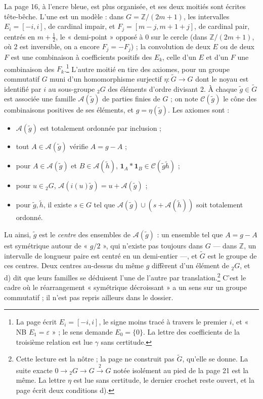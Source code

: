 \documentclass[11pt,a4paper]{article}
\begin{document}
La page 16, à l'encre bleue, est plus organisée, et ses deux moitiés sont
écrites tête-bêche. L'une est un modèle : dans $G = \mathbb{Z}/(2m+1)$, les
intervalles $E_i = [-i, i]$, de cardinal impair, et
$F_j = [m - j, m + 1 + j]$, de cardinal pair, centrés en $m + \tfrac12$, le
« demi-point » opposé à $0$ sur le cercle (dans $\mathbb{Z}/(2m+1)$, où $2$
est inversible, on a encore $F_j = -F_j$) ; la convolution de deux $E$ ou de deux $F$ est une
combinaison à coefficients positifs des $E_k$, celle d'un $E$ et d'un $F$ une
combinaison des $F_k$.\footnote{La page écrit $E_i = [-i, i]$, le signe moins
tracé à travers le premier $i$, et « NB $E_1 = \varepsilon$ » ; le sens demande
$E_0 = \{0\}$. La lettre des coefficients de la troisième relation est lue
$\gamma$ sans certitude.}
L'autre moitié en tire des axiomes, pour un groupe commutatif $G$ muni d'un
homomorphisme surjectif $\eta : \widetilde{G} \to G$ dont le noyau est
identifié par $i$ au sous-groupe ${}_2G$ des éléments d'ordre divisant $2$.
À chaque $\tilde g \in \widetilde{G}$ est associée une famille
$\mathcal{A}(\tilde g)$ de parties finies de $G$ ; on note
$\mathcal{C}(\tilde g)$ le cône des combinaisons positives de ses éléments,
et $g = \eta(\tilde g)$. Les axiomes sont :
\begin{itemize}
  \item[a)] $\mathcal{A}(\tilde g)$ est totalement ordonnée par inclusion ;
  \item[b)] tout $A \in \mathcal{A}(\tilde g)$ vérifie $A = g - A$ ;
  \item[c)] pour $A \in \mathcal{A}(\tilde g)$ et $B \in \mathcal{A}(\tilde h)$,
  $\mathbf{1}_A * \mathbf{1}_B \in \mathcal{C}(\tilde g \tilde h)$ ;
  \item[d)] pour $u \in {}_2G$, $\mathcal{A}(i(u)\tilde g) = u + \mathcal{A}(\tilde g)$ ;
  \item[d')] pour $\tilde g, \tilde h$, il existe $s \in G$ tel que
  $\mathcal{A}(\tilde g) \cup (s + \mathcal{A}(\tilde h))$ soit totalement
  ordonné.
\end{itemize}
Lu ainsi, $\tilde g$ est le \emph{centre} des ensembles de
$\mathcal{A}(\tilde g)$ : un ensemble tel que $A = g - A$ est symétrique
autour de « $g/2$ », qui n'existe pas toujours dans $G$ --- dans $\mathbb{Z}$,
un intervalle de longueur paire est centré en un demi-entier ---, et
$\widetilde{G}$ est le groupe de ces centres. Deux centres au-dessus du même
$g$ diffèrent d'un élément de ${}_2G$, et d) dit que leurs familles se
déduisent l'une de l'autre par translation.\footnote{Cette lecture est la
nôtre ; la page ne construit pas $\widetilde{G}$, qu'elle se donne. La suite
exacte $0 \to {}_2G \to G \xrightarrow{\,2\,} G$ notée isolément au pied de
la page 21 est la même. La lettre $\eta$ est lue sans certitude, le dernier
crochet reste ouvert, et la page écrit deux conditions d).} C'est le cadre où
le réarrangement « symétrique décroissant » a un sens sur un groupe
commutatif ; il n'est pas repris ailleurs dans le dossier.
\end{document}
